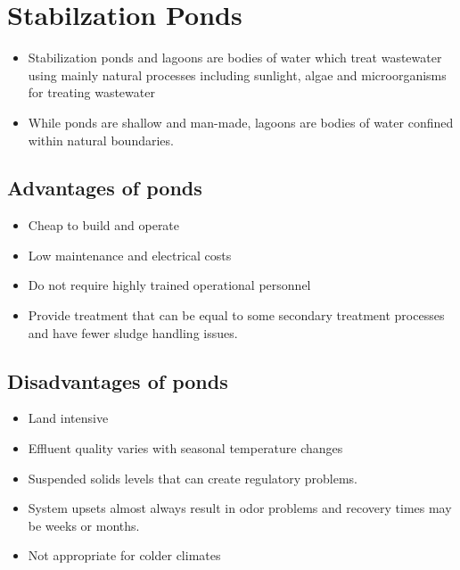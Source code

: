
\chapter{Stabilzation Ponds}

\begin{itemize}
\item Stabilization ponds and lagoons are bodies of water which treat wastewater using mainly natural processes including sunlight, algae and microorganisms for treating wastewater\\
\item While ponds are shallow and man-made, lagoons are bodies of water confined within natural boundaries.\\
\end{itemize}


\section{Advantages of ponds}	

\begin{itemize}	
\item Cheap to build and operate
\item Low maintenance and electrical costs
\item Do not require highly trained operational personnel
\item Provide treatment that can be equal to some secondary treatment processes and have fewer sludge handling issues.\\
\end{itemize}


\section{Disadvantages of ponds}	
\begin{itemize}	
\item Land intensive
\item Effluent quality varies with seasonal temperature changes
\item Suspended solids levels that can create regulatory problems.
\item System upsets almost always result in odor problems and recovery times may be weeks or months.
\item Not appropriate for colder climates
\end{itemize} 


